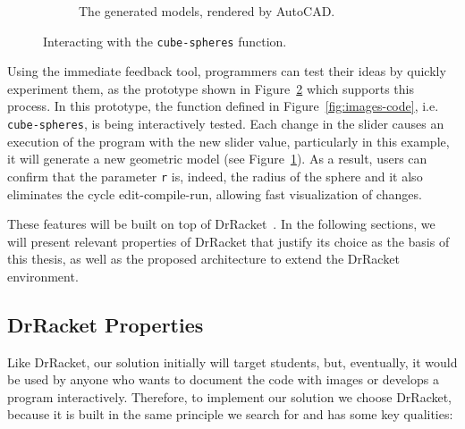 \begin{figure}[htb]
\begin{subfigure}{0.35\textwidth}
                \caption{The generated models, rendered by AutoCAD.}
                \label{fig:cube}
        \end{subfigure}
        \caption{Interacting with the \texttt{cube-spheres} function.}
        \label{fig:slider}
\end{figure}

Using the immediate feedback tool, programmers can test their ideas by quickly experiment them, as the prototype shown in Figure~\ref{fig:slider} which supports this process. In this prototype, the function defined in Figure~\ref{fig:images-code}, i.e. \texttt{cube-spheres}, is being interactively tested. Each change in the slider causes an execution of the program with the new slider value, particularly in this example, it will generate a new geometric model (see Figure~\ref{fig:cube}). As a result, users can confirm that the parameter \texttt{r} is, indeed, the radius of the sphere and it also eliminates the cycle edit-compile-run, allowing fast visualization of changes.  

These features will be built on top of DrRacket~\citep{findler2002drscheme}. In the following sections, we will present relevant properties of DrRacket that justify its choice as the basis of this thesis, as well as the proposed architecture to extend the DrRacket environment.

\subsection{DrRacket Properties}

Like DrRacket, our solution initially will target students, but, eventually, it would be used by anyone who wants to document the code with images or develops a program interactively. Therefore, to implement our solution we choose DrRacket, because it is built in the same principle we search for and has some key qualities:

